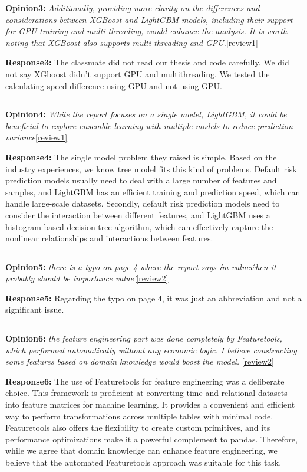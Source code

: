 \documentclass{article}
\begin{document}
\textbf{Opinion3:} 
\textit{Additionally, providing more clarity on the differences and considerations between XGBoost and LightGBM models, including their support for GPU training and multi-threading, would enhance the analysis. It is worth noting that XGBoost also supports multi-threading and GPU.}\ref{review1}


\textbf{Response3:}
The classmate did not read our thesis and code carefully. We did not say XGboost didn't support GPU and multi\-threading. We tested the calculating speed difference using GPU and not using GPU.\cite{mitchell2018xgboost}

\noindent\rule[0.5ex]{16cm}{1pt}

\textbf{Opinion4:} 
\textit{ While the report focuses on a single model, LightGBM, it could be beneficial to explore ensemble learning with multiple models to reduce prediction variance}\ref{review1}

\textbf{Response4:}
The single model problem they raised is simple. Based on the industry experiences, we know tree model fits this kind of problems.\cite{gupta2017analysis} Default risk prediction models usually need to deal with a large number of features and samples, and LightGBM has an efficient training and prediction speed, which can handle large-scale datasets. Secondly, default risk prediction models need to consider the interaction between different features, and LightGBM uses a histogram-based decision tree algorithm, which can effectively capture the nonlinear relationships and interactions between features.

\noindent\rule[0.5ex]{16cm}{1pt}

\textbf{Opinion5:} 
\textit{there is a typo on page 4 where the report says \'im value\' when it probably should be \'importance value\'}\ref{review2}

\textbf{Response5:}
Regarding the typo on page 4, it was just an abbreviation and not a significant issue.

\noindent\rule[0.5ex]{16cm}{1pt}

\textbf{Opinion6:} 
\textit{the feature engineering part was done completely by Featuretools, which performed automatically without any economic logic. I believe constructing some features based on domain knowledge would boost the model. }\ref{review2}

\textbf{Response6:}
The use of Featuretools for feature engineering was a deliberate choice.\cite{schreck2018ai} This framework is proficient at converting time and relational datasets into feature matrices for machine learning. It provides a convenient and efficient way to perform transformations across multiple tables with minimal code. Featuretools also offers the flexibility to create custom primitives, and its performance optimizations make it a powerful complement to pandas. Therefore, while we agree that domain knowledge can enhance feature engineering, we believe that the automated Featuretools approach was suitable for this task.
\end{document}
